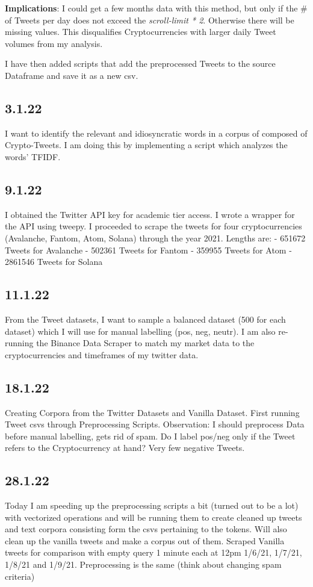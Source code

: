 \textbf{Implications}: I could get a few months data with this method, but only if the \# of Tweets per day does not exceed the \textit{scroll-limit * 2}. Otherwise there will be missing values. This disqualifies Cryptocurrencies with larger daily Tweet volumes from my analysis.

I have then added scripts that add the preprocessed Tweets to the source Dataframe and save it as a new csv.

\subsection{3.1.22}
I want to identify the relevant and idiosyncratic words in a corpus of composed of Crypto-Tweets. I am doing this by implementing a script which analyzes the words' TFIDF. 

\subsection{9.1.22}
I obtained the Twitter API key for academic tier access. I wrote a wrapper for the API using tweepy. I proceeded to scrape the tweets for four cryptocurrencies (Avalanche, Fantom, Atom, Solana) through the year 2021.
Lengths are: 
- 651672 Tweets for Avalanche
- 502361 Tweets for Fantom
- 359955 Tweets for Atom
- 2861546 Tweets for Solana

\subsection{11.1.22}
From the Tweet datasets, I want to sample a balanced dataset (500 for each dataset) which I will use for manual labelling (pos, neg, neutr). I am also re-running the Binance Data Scraper to match my market data to the cryptocurrencies and timeframes of my twitter data.

\subsection{18.1.22}
Creating Corpora from the Twitter Datasets and Vanilla Dataset. First running Tweet csvs through Preprocessing Scripts. Observation: I should preprocess Data before manual labelling, gets rid of spam. Do I label pos/neg only if the Tweet refers to the Cryptocurrency at hand? Very few negative Tweets.

\subsection{28.1.22}
Today I am speeding up the preprocessing scripts a bit (turned out to be a lot) with vectorized operations and will be running them to create cleaned up tweets and text corpora consisting form the csvs pertaining to the tokens. Will also clean up the vanilla tweets and make a corpus out of them. 
Scraped Vanilla tweets for comparison with empty query 1 minute each at 12pm 1/6/21, 1/7/21, 1/8/21 and 1/9/21. Preprocessing is the same (think about changing spam criteria)

